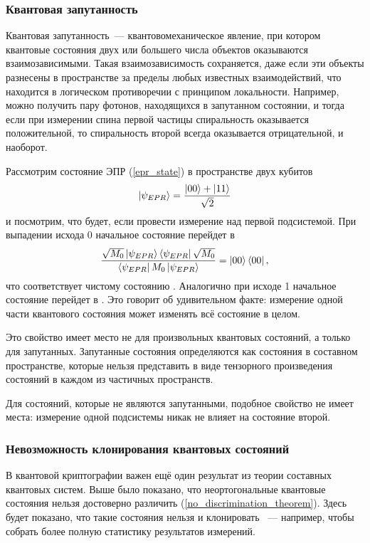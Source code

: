 \subsubsection{Квантовая запутанность}
Квантовая запутанность~--- квантовомеханическое явление, при котором квантовые состояния двух или большего числа объектов оказываются взаимозависимыми. Такая взаимозависимость сохраняется, даже если эти объекты разнесены в пространстве за пределы любых известных взаимодействий, что находится в логическом противоречии с принципом локальности. 
Например, можно получить пару фотонов, находящихся в запутанном состоянии, и тогда если при измерении спина первой частицы спиральность оказывается положительной, то спиральность второй всегда оказывается отрицательной, и наоборот.

Рассмотрим состояние ЭПР (\ref{epr_state}) в пространстве двух кубитов
\begin{equation}\left| \psi_{EPR} \right\rangle = \frac{\left| 00 \right\rangle + \left| 11 \right\rangle}{\sqrt{2}}\end{equation}
и посмотрим, что будет, если провести измерение над первой подсистемой. При выпадении исхода 0 начальное состояние перейдет в 
\begin{equation} \frac{\sqrt{M_0}\left| \psi_{EPR} \right\rangle\left\langle \psi_{EPR} \right|\sqrt{M_0}}{ \left\langle \psi_{EPR} \right|M_0\left| \psi_{EPR} \right\rangle} = \left| 00 \right\rangle\left\langle 00 \right|, \end{equation}
что соответствует чистому состоянию . Аналогично при исходе 1 начальное состояние перейдет в . Это говорит об удивительном факте: измерение одной части квантового состояния может изменять всё состояние в целом.

Это свойство имеет место не для произвольных квантовых состояний, а только для запутанных. Запутанные состояния определяются как состояния в составном пространстве, которые нельзя представить в виде тензорного произведения состояний в каждом из частичных пространств.

Для состояний, которые не являются запутанными, подобное свойство не имеет места: измерение одной подсистемы никак не влияет на состояние второй.

\subsubsection{Невозможность клонирования квантовых состояний}\label{no_cloning_theorem}
В квантовой криптографии важен ещё один результат из теории составных квантовых систем. Выше было показано, что неортогональные квантовые состояния нельзя достоверно различить (\ref{no_discrimination_theorem}). Здесь будет показано, что такие состояния нельзя и клонировать \cite{no_cloning_theorem}~--- например, чтобы собрать более полную статистику результатов измерений.

